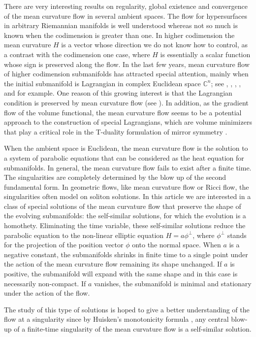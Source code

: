 \documentclass[leqno,11pt]{amsart}
\begin{document}
There are very interesting results on regularity, global existence
and convergence of the mean curvature flow in several ambient
spaces. The flow for hypersurfaces in arbitrary Riemannian
manifolds is well understood whereas not so much is known when the
codimension is greater than one.  In higher codimension the mean
curvature $H$ is a vector whose direction we do not know how to
control, as a contrast with the codimension one case, where $H$ is
essentially a scalar function whose sign is preserved along the
flow. In the last few years, mean curvature flow of higher
codimension submanifolds has attracted special attention, mainly
when the initial submanifold is Lagrangian in complex Euclidean
space ${\mathbb{C}}^n$; see \cite{ChL}, \cite{GSSZ}, \cite{N1}, \cite{N2},
\cite{TY} and \cite{Wa} for example. One reason of this growing
interest is that the Lagrangian condition is preserved by mean
curvature flow (see \cite{S}). In addition, as the gradient flow
of the volume functional, the mean curvature flow seems to be a
potential approach to the construction of special Lagrangians,
which are volume minimizers that play a critical role in the
T-duality formulation of mirror symmetry \cite{SYZ}.

When the ambient space is Euclidean, the mean curvature flow is
the solution to a system of parabolic equations that can be
considered as the heat equation for submanifolds. In general, the
mean curvature flow fails to exist after a finite time. The
singularities are completely determined by the blow up of the
second fundamental form. In geometric flows, like mean curvature
flow or Ricci flow, the singularities often model on soliton
solutions. In this article we are interested in a class of special
solutions of the mean curvature flow that preserve the shape of
the evolving submanifolds: the self-similar solutions, for which
the evolution is a homothety. Eliminating the time variable, these
self-similar solutions reduce the parabolic equation to the
non-linear elliptic equation $H=a\phi^\perp$, where $\phi^\perp $
stands for the projection of the position vector $\phi $ onto the
normal space. When $a$ is a negative constant, the submanifolds
shrinks in finite time to a single point under the action of the
mean curvature flow remaining its shape unchanged. If $a$ is
positive, the submanifold will expand with the same shape and in
this case is necessarily non-compact. If $a$ vanishes, the
submanifold is minimal and stationary under the action of the
flow.

The study of this type of solutions is hoped to give a better
understanding of the flow at a singularity since by Huisken's
monotonicity formula \cite{Hu}, any central blow-up of a
finite-time singularity of the mean curvature flow is a
self-similar solution.
\end{document}
